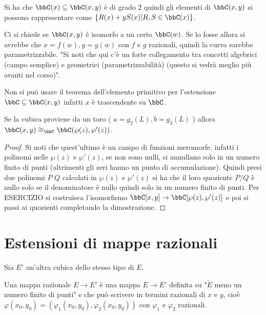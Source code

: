 \begin{osservazione}
Si ha che $\bbC(x)\subseteq\bbC(x,y)$ è di grado $2$ quindi gli elementi di $\bbC(x,y)$ si possono rappresentare come $\{ R(x)+y S(x) | R,S \in \bbC(x)\}$.
\end{osservazione}

Ci si chiede se $\bbC(x,y)$ è isomorfo a un certo $\bbC(w)$.
Se lo fosse allora si avrebbe che $x=f(w), y=g(w)$ con $f$ e $g$ razionali, quindi la curva sarebbe parametrizzabile. "Si noti che qui c'è un forte collegamento tra concetti algebrici (campo semplice) e geometrici (parametrizzabilità) (questo si vedrà meglio più avanti nel corso)".

\begin{osservazione}
Non si può usare il teorema dell'elemento primitivo per l'estensione $\bbC\subseteq\bbC(x,y)$ infatti $x$ è trascendente su $\bbC$.
\end{osservazione}

\begin{proposizione}Se la cubica proviene da un toro ( $a=g_2(L), b=g_3(L)$ ) allora $\bbC(x,y)\cong_{\bbC}\bbC(\wp(z),\wp'(z))$.
\end{proposizione}

\begin{proof}
Si noti che quest'ultimo è un campo di funzioni meromorfe, infatti i polinomi nelle $\wp(z)$ e $\wp'(z)$, se non sono nulli, si annullano solo in un numero finito di punti (altrimenti gli zeri hanno un punto di accumulazione). Quindi presi due polinomi $P$ $Q$ calcolati in $\wp(z)$ e $\wp'(z)$ si ha che il loro quoziente $P/Q$ è nullo solo se il denominatore è nullo quindi solo in un numero finito di punti. Per ESERCIZIO si costruisca l'isomorfismo $\bbC[x,y]\rightarrow\bbC[\wp(z),\wp'(z)]$ e poi si passi ai quozienti completando la dimostrazione.
\end{proof}


\section{Estensioni di mappe razionali}
Sia $E'$ un'altra cubica dello stesso tipo di $E$.

\begin{definizione}
Una mappa razionale $E\rightarrow E'$ è una mappa $E\rightarrow E'$ definita su "$\tilde{E}$ meno un numero finito di punti" e che può scrivere in termini razionali di $x$ e $y$, cioè $\varphi(x_0,y_0)=(\varphi_1(x_0,y_0),\varphi_2(x_0,y_0) )$ con $\varphi_1$ e $\varphi_2$ razionali.
\end{definizione}

